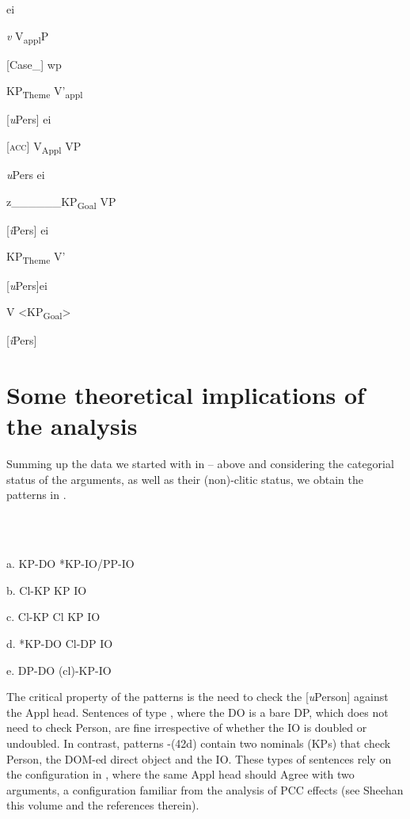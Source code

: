 \documentclass[output=paper,colorlinks,citecolor=brown]{./langscibook}
\begin{document}
        ei

        \textit{v}    V\textsubscript{appl}P

        [Case\_]     wp

          KP\textsubscript{Theme}    V’\textsubscript{appl}

          [\textit{u}Pers]             ei

          [\textsc{acc}]  V\textsubscript{Appl}    VP

            \textit{u}Pers  ei

            z\_\_\_\_\_\_KP\textsubscript{Goal}    VP

              [\textit{i}Pers]  ei

              KP\textsubscript{Theme}  V’

              [\textit{u}Pers]ei

                V            <KP\textsubscript{Goal}>

                  [\textit{i}Pers]

\section{Some theoretical implications of the analysis} %

Summing up the data we started with in  –  above and considering the categorial status of the arguments, as well as their (non)-clitic status, we obtain the patterns in . 

\ea%
    \label{ex:key:42}
    \gll\\
        \\
    \glt
    \z

           a.  KP-DO    *KP-IO/PP-IO

b.  Cl-KP      KP IO

c.  Cl-KP      Cl KP IO

d.  *KP-DO    Cl-DP IO

 e.  DP-DO    (cl)-KP-IO 

The critical property of the patterns is the need to check the [\textit{u}Person] against the Appl head. Sentences of type , where the DO is a bare DP, which does not need to check Person, are fine irrespective of whether the IO is doubled or undoubled. In contrast, patterns -(42d) contain two nominals (KPs) that check Person, the DOM-ed direct object and the IO. These types of sentences rely on the configuration in , where the same Appl head should Agree with two arguments, a configuration familiar from the analysis of PCC effects (see Sheehan this volume and the references therein). 
\end{document}
